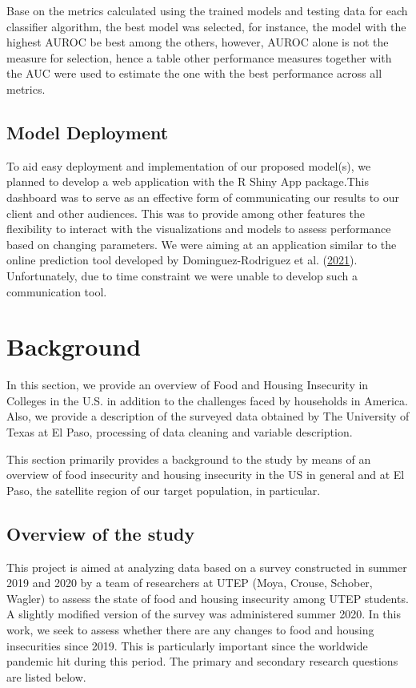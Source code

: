 \documentclass[
  10pt,
]{article}
\begin{document}
Base on the metrics calculated using the trained models and testing data for each classifier algorithm, the best model was selected, for instance, the model with the highest AUROC be best among the others, however, AUROC alone is not the measure for selection, hence a table other performance measures together with the AUC were used to estimate the one with the best performance across all metrics.

\hypertarget{model-deployment}{%
\subsection{Model Deployment}\label{model-deployment}}

To aid easy deployment and implementation of our proposed model(s), we planned to develop a web application with the R Shiny App package.This dashboard was to serve as an effective form of communicating our results to our client and other audiences. This was to provide among other features the flexibility to interact with the visualizations and models to assess performance based on changing parameters. We were aiming at an application similar to the online prediction tool developed by Dominguez-Rodriguez et al. (\protect\hyperlink{ref-dominguez2021bayesian}{2021}). Unfortunately, due to time constraint we were unable to develop such a communication tool.

\section{Background}

In this section, we provide an overview of Food and Housing Insecurity in Colleges in the U.S. in addition to the challenges faced by households in America. Also, we provide a description of the surveyed data obtained by The University of Texas at El Paso, processing of data cleaning and variable description.

This section primarily provides a background to the study by means of an overview of food insecurity and housing insecurity in the US in general and at El Paso, the satellite region of our target population, in particular.

\hypertarget{overview-of-the-study}{%
\subsection{Overview of the study}\label{overview-of-the-study}}

This project is aimed at analyzing data based on a survey constructed in summer 2019 and 2020 by a team of researchers at UTEP (Moya, Crouse, Schober, Wagler) to assess the state of food and housing insecurity among UTEP students. A slightly modified version of the survey was administered summer 2020. In this work, we seek to assess whether there are any changes to food and housing insecurities since 2019. This is particularly important since the worldwide pandemic hit during this period. The primary and secondary research questions are listed below.
\end{document}
